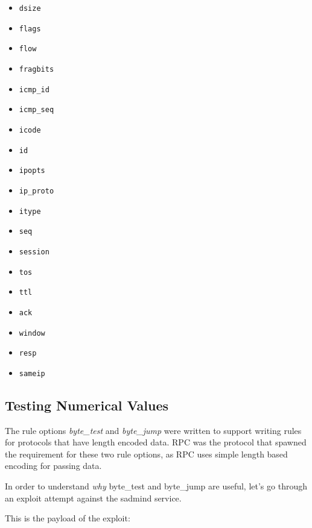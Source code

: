 \documentclass[english]{report}
\begin{document}
\begin{itemize}
\item \texttt{dsize}
\item \texttt{flags}
\item \texttt{flow}
\item \texttt{fragbits}
\item \texttt{icmp\_id}
\item \texttt{icmp\_seq} 
\item \texttt{icode} 
\item \texttt{id}
\item \texttt{ipopts}
\item \texttt{ip\_proto} 
\item \texttt{itype} 
\item \texttt{seq}
\item \texttt{session} 
\item \texttt{tos}
\item \texttt{ttl}
\item \texttt{ack}
\item \texttt{window}
\item \texttt{resp} 
\item \texttt{sameip}
\end{itemize}

\subsection{Testing Numerical Values}
\label{testing numerical values}

The rule options \emph{byte\_test} and \emph{byte\_jump} were written to
support writing rules for protocols that have length encoded data.  RPC was the
protocol that spawned the requirement for these two rule options, as RPC uses
simple length based encoding for passing data.

In order to understand \emph{why} byte\_test and byte\_jump are useful, let's
go through an exploit attempt against the sadmind service.

This is the payload of the exploit:
\end{document}
